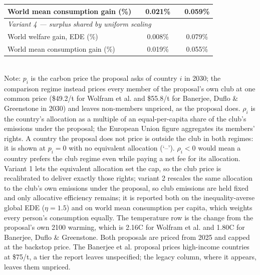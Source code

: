 \begin{table}[htbp]
\begin{tabular}{lcccc}
  \quad World mean consumption gain (\%) &  & 0.021\% &  & 0.059\% \\
  \midrule
  \multicolumn{5}{l}{\textit{Variant 4 --- surplus shared by uniform scaling}} \\
  \quad World welfare gain, EDE (\%) &  & 0.008\% &  & 0.079\% \\
  \quad World mean consumption gain (\%) &  & 0.019\% &  & 0.055\% \\
  \bottomrule
\end{tabular}
\label{tab:equiv_rights_B}
\\[4pt]
{\footnotesize Note: $p_i$ is the carbon price the proposal asks of country $i$ in 2030; the comparison regime instead prices every member of the proposal's own club at one common price (\$49.2/t for Wolfram et al. and \$55.8/t for Banerjee, Duflo \& Greenstone in 2030) and leaves non-members unpriced, as the proposal does. $\rho_i$ is the country's allocation as a multiple of an equal-per-capita share of the club's emissions under the proposal; the European Union figure aggregates its members' rights. A country the proposal does not price is outside the club in both regimes: it is shown at $p_i=0$ with no equivalent allocation (`--'). $\rho_i < 0$ would mean a country prefers the club regime even while paying a net fee for its allocation. Variant 1 lets the equivalent allocation set the cap, so the club price is recalibrated to deliver exactly those rights; variant 2 rescales the same allocation to the club's own emissions under the proposal, so club emissions are held fixed and only allocative efficiency remains; it is reported both on the inequality-averse global EDE ($\eta=1.5$) and on world mean consumption per capita, which weights every person's consumption equally. The temperature row is the change from the proposal's own 2100 warming, which is 2.16\textdegree{}C for Wolfram et al. and 1.80\textdegree{}C for Banerjee, Duflo \& Greenstone. Both proposals are priced from 2025 and capped at the backstop price. The Banerjee et al. proposal prices high-income countries at \$75/t, a tier the report leaves unspecified; the legacy column, where it appears, leaves them unpriced.}
\end{table}
